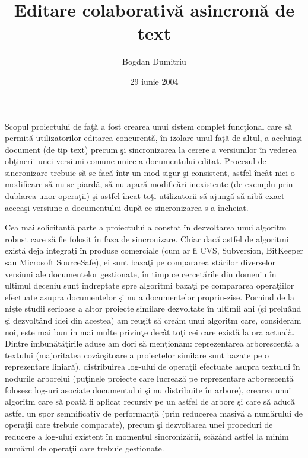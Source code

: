 \documentclass[a4paper]{article}
\title{Editare colaborativ\u a asincron\u a de text}
\author{Bogdan Dumitriu}
\date{29 iunie 2004}
\begin{document}
\maketitle

Scopul proiectului de fa\c t\u a a fost crearea unui sistem complet
func\c tional care s\u a permit\u a utilizatorilor editarea
concurent\u a, \^ in izolare unul fa\c t\u a de altul, a aceluia\c si
document (de tip text) precum \c si sincronizarea la cerere a
versiunilor \^ in vederea ob\c tinerii unei versiuni comune unice a
documentului editat. Procesul de sincronizare trebuie s\u a se fac\u a
\^ intr-un mod sigur \c si consistent, astfel \^ inc\^ at nici o
modificare s\u a nu se piard\u a, s\u a nu apar\u a modific\u ari
inexistente (de exemplu prin dublarea unor opera\c tii) \c si astfel
\^ incat to\c ti utilizatorii s\u a ajung\u a s\u a aib\u a exact
aceea\c si versiune a documentului dup\u a ce sincronizarea s-a \^ incheiat.

Cea mai solicitant\u a parte a proiectului a constat \^ in dezvoltarea
unui algoritm robust care s\u a fie folosit \^ in faza de sincronizare.
Chiar dac\u a astfel de algoritmi exist\u a deja integra\c ti \^ in produse
comerciale (cum ar fi CVS, Subversion, BitKeeper sau Microsoft SourceSafe),
ei sunt baza\c ti pe compararea st\u arilor diverselor versiuni ale
documentelor gestionate, \^ in timp ce cercet\u arile din domeniu  \^ in
ultimul deceniu sunt \^ indreptate spre algoritmi baza\c ti pe compararea
opera\c tiilor efectuate asupra documentelor \c si nu a documentelor propriu-zise.
Pornind de la ni\c ste studii serioase a altor proiecte similare dezvoltate
\^ in ultimii ani (\c si prelu\^ and \c si dezvolt\^ and idei din acestea)
am reu\c sit s\u a cre\u am unui algoritm care, consider\u am noi, este
mai bun \^ in mai multe privin\c te dec\^ at to\c ti cei care exist\u a la ora
actual\u a. Dintre \^ imbun\u at\u a\c tirile aduse am dori s\u a men\c tion\u am:
reprezentarea arborescent\u a a textului (majoritatea cov\^ ar\c sitoare a
proiectelor similare sunt bazate pe o reprezentare liniar\u a), distribuirea
log-ului de opera\c tii efectuate asupra textului \^ in nodurile arborelui
(pu\c tinele proiecte care lucreaz\u a pe reprezentare arborescent\u a folosesc
log-uri asociate documentului \c si nu distribuite \^ in arbore), crearea
unui algoritm care s\u a poat\u a fi aplicat recursiv pe un astfel de arbore
\c si care s\u a aduc\u a astfel un spor semnificativ de performan\c t\u a
(prin reducerea masiv\u a a num\u arului de opera\c tii care trebuie comparate),
precum \c si dezvoltarea unei proceduri de reducere a log-ului existent \^ in momentul
sincroniz\u arii, sc\u az\^ and astfel la minim num\u arul de opera\c tii care
trebuie gestionate.
\end{document}
